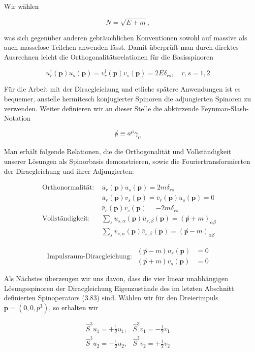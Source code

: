 \documentclass[10pt, letterpaper]{article}
\begin{document}
Wir wählen

$$
N=\sqrt{E+m},
$$

was sich gegenüber anderen gebräuchlichen Konventionen sowohl auf massive als auch masselose Teilchen anwenden lässt. Damit überprüft man durch direktes Ausrechnen leicht die Orthogonalitätsrelationen für die Basisspinoren

$$
u_{r}^{\dagger}(\mathbf{p}) u_{s}(\mathbf{p})=v_{r}^{\dagger}(\mathbf{p}) v_{s}(\mathbf{p})=2 E \delta_{r s}, \quad r, s=1,2
$$

Für die Arbeit mit der Diracgleichung und etliche spätere Anwendungen ist es bequemer, anstelle hermitesch konjugierter Spinoren die adjungierten Spinoren zu verwenden. Weiter definieren wir an dieser Stelle die abkürzende Feynman-Slash-Notation

$$
\not a \equiv a^{\mu} \gamma_{\mu}
$$

Man erhält folgende Relationen, die die Orthogonalität und Vollständigkeit unserer Lösungen als Spinorbasis demonstrieren, sowie die Fouriertransformierten der Diracgleichung und ihrer Adjungierten:

$$
\begin{array}{ll}
\text { Orthonormalität: } & \bar{u}_{r}(\mathbf{p}) u_{s}(\mathbf{p})=2 m \delta_{r s} \\
& \bar{u}_{r}(\mathbf{p}) v_{s}(\mathbf{p})=\bar{v}_{r}(\mathbf{p}) u_{s}(\mathbf{p})=0 \\
& \bar{v}_{r}(\mathbf{p}) v_{s}(\mathbf{p})=-2 m \delta_{r s} \\
\text { Vollständigkeit: } & \sum_{s} u_{s, \alpha}(\mathbf{p}) \bar{u}_{s, \beta}(\mathbf{p})=(\not p+m)_{\alpha \beta} \\
& \sum_{s} v_{s, \alpha}(\mathbf{p}) \bar{v}_{s, \beta}(\mathbf{p})=(\not p-m)_{\alpha \beta}
\end{array}
$$

$$
\text { Impulsraum-Diracgleichung: } \begin{aligned}
(\not p-m) u_{s}(\mathbf{p}) & =0 \\
(\not p+m) v_{s}(\mathbf{p}) & =0
\end{aligned}
$$

Als Nächstes überzeugen wir uns davon, dass die vier linear unabhängigen Lösungsspinoren der Diracgleichung Eigenzustände des im letzten Abschnitt definierten Spinoperators (3.83) sind. Wählen wir für den Dreierimpuls $\mathbf{p}=\left(0,0, p^{3}\right)$, so erhalten wir

$$
\begin{array}{ll}
\hat{S}^{3} u_{1}=+\frac{1}{2} u_{1}, & \hat{S}^{3} v_{1}=-\frac{1}{2} v_{1} \\
\hat{S}^{3} u_{2}=-\frac{1}{2} u_{2}, & \hat{S}^{3} v_{2}=+\frac{1}{2} v_{2}
\end{array}
$$
\end{document}
